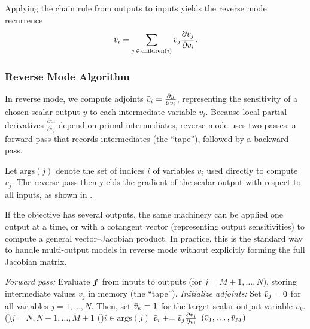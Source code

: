 Applying the chain rule from outputs to inputs yields the reverse mode recurrence
\begin{equation}
  \bar{v}_i = \sum_{j\,\in\,\text{children}(i)} \bar{v}_j \frac{\partial v_j}{\partial v_i}.
\end{equation}

\subsubsection{Reverse Mode Algorithm}

In reverse mode, we compute adjoints $\bar{v}_i=\tfrac{\partial y}{\partial v_i}$, representing the sensitivity of a chosen scalar output $y$ to each intermediate variable $v_i$. Because local partial derivatives $\tfrac{\partial v_j}{\partial v_i}$ depend on primal intermediates, reverse mode uses two passes: a forward pass that records intermediates (the \enquote{tape}), followed by a backward pass.

Let $\text{args}(j)$ denote the set of indices $i$ of variables $v_i$ used directly to compute $v_j$. The reverse pass then yields the gradient of the scalar output with respect to all inputs, as shown in .

If the objective has several outputs, the same machinery can be applied one output at a time, or with a cotangent vector (representing output sensitivities) to compute a general vector--Jacobian product. In practice, this is the standard way to handle multi-output models in reverse mode without explicitly forming the full Jacobian matrix.

\begin{algorithm}
  \caption{Reverse mode \gls{ad}.}
  \label{alg:reverse-mode}
  \DontPrintSemicolon
  \emph{Forward pass:} Evaluate $\boldsymbol{f}$ from inputs to outputs (for $j = M+1, \ldots, N$), storing intermediate values $v_j$ in memory (the \enquote{tape}).\;
  \emph{Initialize adjoints:} Set $\bar{v}_j = 0$ for all variables $j = 1, \ldots, N$. Then, set $\bar{v}_k = 1$ for the target scalar output variable $v_k$.\;
  \For(){$j = N, N-1, \ldots, M+1$}{
    \For(){$i \in \text{args}(j)$}{
      $\bar{v}_i \mathrel{+}= \bar{v}_j \frac{\partial v_j}{\partial v_i}$\;
    }
  }
  \KwRet $(\bar{v}_1, \ldots, \bar{v}_M)$
\end{algorithm}

